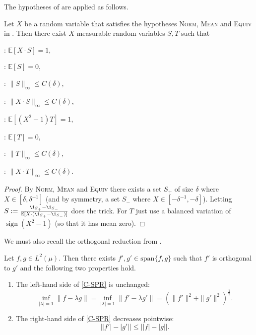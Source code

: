 \documentclass{inprogress}
\newcommand{\sign}{\operatorname{sign}}
\newcommand{\Hyp}[1]{\item[\textsc{#1}]\label{hyp:#1}\!\!\!\textsc{:}}
\newcommand{\hyp}[1]{\textsc{#1}}
\begin{document}
The hypotheses of  are applied as follows.
\begin{lemma}\label{lem:trunc}
    Let $X$ be a random variable that satisfies the hypotheses \hyp{Norm}, \hyp{Mean} and \hyp{Equiv} in . Then there exist $X$-measurable random variables $S,T$ such that

    \begin{minipage}{.49\textwidth}
    \begin{hypotheses}
        \Hyp{ReprS} $\mathbb E[X\cdot S] = 1$,
        \Hyp{MeanS} $\mathbb E[S] = 0$,
        \Hyp{BoundS} $\|S\|_\infty \le C(\delta)$,
        \Hyp{SuppS} $\|X\cdot S\|_\infty \le C(\delta)$,
    \end{hypotheses}
    \end{minipage}
    \begin{minipage}{.49\textwidth}
    \begin{hypotheses}
        \Hyp{ReprT} $\mathbb E[(X^2-1)T] = 1$,
        \Hyp{MeanT} $\mathbb E[T] = 0$,
        \Hyp{BoundT} $\|T\|_\infty \le C(\delta)$,
        \color{red}
        \Hyp{SuppT} $\|X\cdot T\|_\infty \le C(\delta)$.
        \color{black}
    \end{hypotheses}
    \end{minipage}
\end{lemma}
\begin{proof}

By \hyp{Norm}, \hyp{Mean} and \hyp{Equiv} there exists a set $S_+$ of size $\delta$ where $X \in [\delta, \delta^{-1}]$ (and by symmetry, a set $S_{-}$ where $X \in [ -\delta^{-1},-\delta]$). Letting $S:= \frac{\1_{S_+}-\1_{S_-}}{\mathbb E[X\cdot (\1_{S_+}-\1_{S_-})]}$ does the trick. For $T$ just use a balanced variation of $\sign(X^2-1)$ (so that it has mean zero).
\end{proof}
We must also recall the orthogonal reduction from \cite{FOTP}.
\begin{theorem}\label{ortho red}
    Let $f,g\in L^2(\mu)$. Then there exists $f',g'\in \text{span}\{f,g\}$ such that $f'$ is orthogonal to $g'$ and the following two properties hold.
    \begin{enumerate}
        \item The left-hand side of \eqref{C-SPR} is unchanged: $$\inf_{|\lambda|=1}\|f-\lambda g\|=\inf_{|\lambda|=1}\|f'-\lambda g'\|= (\|f'\|^2+\|g'\|^2)^\frac{1}{2}.$$
        \item The right-hand side of \eqref{C-SPR} decreases pointwise:
        $$\left| |f'|-|g'|\right|\leq \left| |f|-|g|\right|.$$
    \end{enumerate}
\end{theorem}
\end{document}
